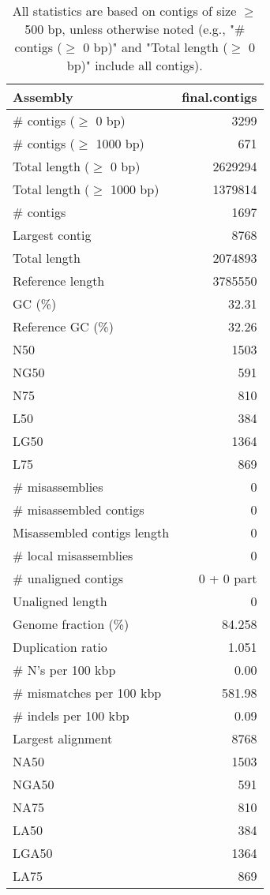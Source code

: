 \documentclass[12pt,a4paper]{article}
\begin{document}
\begin{table}[ht]
\begin{center}
\caption{All statistics are based on contigs of size $\geq$ 500 bp, unless otherwise noted (e.g., "\# contigs ($\geq$ 0 bp)" and "Total length ($\geq$ 0 bp)" include all contigs).}
\begin{tabular}{|l*{1}{|r}|}
\hline
Assembly & final.contigs \\ \hline
\# contigs ($\geq$ 0 bp) & 3299 \\ \hline
\# contigs ($\geq$ 1000 bp) & 671 \\ \hline
Total length ($\geq$ 0 bp) & 2629294 \\ \hline
Total length ($\geq$ 1000 bp) & 1379814 \\ \hline
\# contigs & 1697 \\ \hline
Largest contig & 8768 \\ \hline
Total length & 2074893 \\ \hline
Reference length & 3785550 \\ \hline
GC (\%) & 32.31 \\ \hline
Reference GC (\%) & 32.26 \\ \hline
N50 & 1503 \\ \hline
NG50 & 591 \\ \hline
N75 & 810 \\ \hline
L50 & 384 \\ \hline
LG50 & 1364 \\ \hline
L75 & 869 \\ \hline
\# misassemblies & 0 \\ \hline
\# misassembled contigs & 0 \\ \hline
Misassembled contigs length & 0 \\ \hline
\# local misassemblies & 0 \\ \hline
\# unaligned contigs & 0 + 0 part \\ \hline
Unaligned length & 0 \\ \hline
Genome fraction (\%) & 84.258 \\ \hline
Duplication ratio & 1.051 \\ \hline
\# N's per 100 kbp & 0.00 \\ \hline
\# mismatches per 100 kbp & 581.98 \\ \hline
\# indels per 100 kbp & 0.09 \\ \hline
Largest alignment & 8768 \\ \hline
NA50 & 1503 \\ \hline
NGA50 & 591 \\ \hline
NA75 & 810 \\ \hline
LA50 & 384 \\ \hline
LGA50 & 1364 \\ \hline
LA75 & 869 \\ \hline
\end{tabular}
\end{center}
\end{table}
\end{document}
